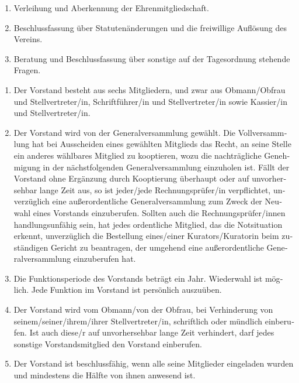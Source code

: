 \begin{otherlanguage}{german}
\begin{enumerate}[statutenenum]
    \item Verleihung und Aberkennung der Ehrenmitgliedschaft.

    \item Beschlussfassung über Statutenänderungen und die freiwillige Auflösung des Vereins.

    \item Beratung und Beschlussfassung über sonstige auf der Tagesordnung stehende Fragen.
\end{enumerate}


\begin{enumerate}[statutenenum]
    \item Der Vorstand besteht aus sechs Mitgliedern, und zwar aus Obmann/Obfrau und Stellvertreter/in, Schriftführer/in und Stellvertreter/in sowie Kassier/in und Stellvertreter/in.

    \item Der Vorstand wird von der Generalversammlung gewählt.
        Die Vollversammlung hat bei Ausscheiden eines gewählten Mitglieds das Recht, an seine Stelle ein anderes wählbares Mitglied zu kooptieren, wozu die nachträgliche Genehmigung in der nächstfolgenden Generalversammlung einzuholen ist.
        Fällt der Vorstand ohne Ergänzung durch Kooptierung überhaupt oder auf unvorhersehbar lange Zeit aus, so ist jeder/jede Rechnungsprüfer/in verpflichtet, unverzüglich eine außerordentliche Generalversammlung zum Zweck der Neuwahl eines Vorstands einzuberufen.
        Sollten auch die Rechnungsprüfer/innen handlungsunfähig sein, hat jedes ordentliche Mitglied, das die Notsituation erkennt, unverzüglich die Bestellung eines/einer Kurators/Kuratorin beim zuständigen Gericht zu beantragen, der umgehend eine außerordentliche Generalversammlung einzuberufen hat.

    \item Die Funktionsperiode des Vorstands beträgt ein Jahr.
        Wiederwahl ist möglich.
        Jede Funktion im Vorstand ist persönlich auszuüben.

    \item Der Vorstand wird vom Obmann/von der Obfrau, bei Verhinderung von seinem/seiner/ihrem/ihrer Stellvertreter/in, schriftlich oder mündlich einberufen.
        Ist auch diese/r auf unvorhersehbar lange Zeit verhindert, darf jedes sonstige Vorstandsmitglied den Vorstand einberufen.

    \item Der Vorstand ist beschlussfähig, wenn alle seine Mitglieder eingeladen wurden und mindestens die Hälfte von ihnen anwesend ist.


\end{enumerate}
\end{otherlanguage}

